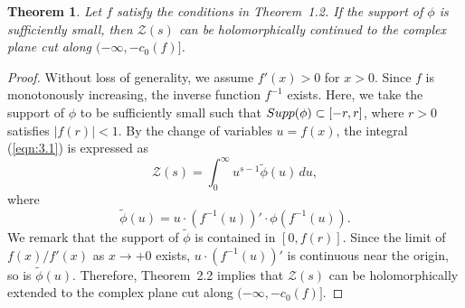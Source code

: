 \documentclass[10pt,a4paper]{amsart}
\numberwithin{equation}{section}
\newtheorem{theorem}{Theorem}[section]
\newcommand{\1}{{\bf 1}}
\begin{document}
\begin{theorem}\label{thm:3.1}
Let $f$ satisfy the conditions in Theorem~1.2.
If the support of $\phi$ is sufficiently small,
then
$\mathcal{Z}(s)$ can be holomorphically continued
to the complex plane cut along $(-\infty,-c_0(f)]$.
\end{theorem}

\begin{proof}
Without loss of generality, we assume 
$f'(x)>0$ for $x>0$.
Since $f$ is monotonously increasing, 
the inverse function $f^{-1}$ exists.
Here, 
we take the support of $\phi$ to be sufficiently small such that ${\rm Supp}(\phi)\subset [-r,r]$, 
where $r>0$ satisfies $|f(r)|<1$.
By the change of variables $u=f(x)$,
the integral (\ref{eqn:3.1}) is expressed as
\begin{equation}\label{eqn:3.2}
\mathcal{Z}(s)=\int_0^{\infty} u^{s-1}\tilde{\phi}(u)\,du,
\end{equation}
where 
\begin{equation}
\tilde{\phi}(u)=u\cdot(f^{-1}(u))' 
\cdot \phi(f^{-1}(u)).
\end{equation}\label{eqn:3.3}
We remark that 
the support of $\tilde{\phi}$ is 
contained in $[0, f(r)]$. 
Since the limit of $f(x)/f'(x)$ as $x\to +0$ exists,
$u\cdot(f^{-1}(u))'$ is continuous near the origin,
so is $\tilde{\phi}(u)$. 
Therefore, Theorem~2.2 implies that 
$\mathcal{Z}(s)$ can be holomorphically extended to
the complex plane cut along $(-\infty,-c_0(f)]$.
\end{proof}
\end{document}
